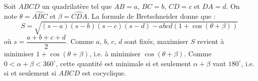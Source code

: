 Soit $ABCD$ un quadrilatère tel que $AB = a$, $BC = b$, $CD = c$ et $DA = d$. On note $\theta = \widehat{ABC}$ et $\beta = \widehat{CDA}$. La formule de Bretschneider donne que :
$$S = \sqrt{(s - a)(s - b)(s - c)(s - d) - abcd(1 + \cos(\theta+\beta))}$$
où $s = \dfrac{a + b + c + d}2$. Comme $a$, $b$, $c$, $d$ sont fixés, maximiser $S$ revient à minimiser $1 + \cos(\theta + \beta)$, i.e. à minimiser $\cos(\theta + \beta)$. Comme $0 < \alpha + \beta < 360^\circ$, cette quantité est minimale si et seulement $\alpha + \beta$ vaut $180^\circ$, i.e. si et seulement si $ABCD$ est cocyclique.